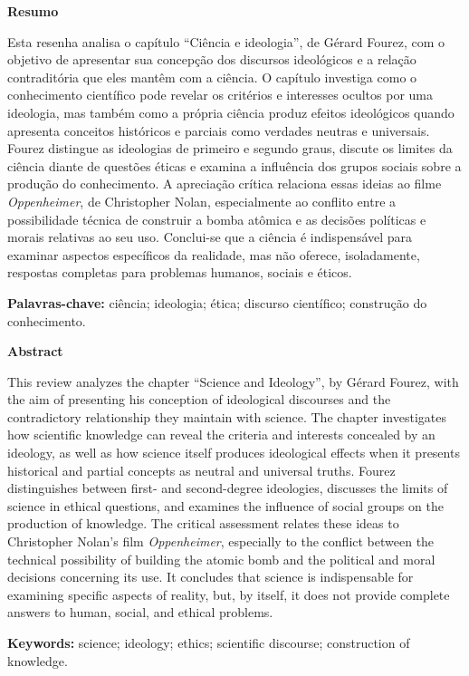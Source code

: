 \documentclass[12pt,a4paper]{article}
\begin{document}
\begin{singlespace}
\noindent\textbf{Resumo}

Esta resenha analisa o capítulo ``Ciência e ideologia'', de Gérard Fourez,
com o objetivo de apresentar sua concepção dos discursos ideológicos e a
relação contraditória que eles mantêm com a ciência. O capítulo investiga
como o conhecimento científico pode revelar os critérios e interesses
ocultos por uma ideologia, mas também como a própria ciência produz efeitos
ideológicos quando apresenta conceitos históricos e parciais como verdades
neutras e universais. Fourez distingue as ideologias de primeiro e segundo
graus, discute os limites da ciência diante de questões éticas e examina a
influência dos grupos sociais sobre a produção do conhecimento. A apreciação
crítica relaciona essas ideias ao filme \textit{Oppenheimer}, de Christopher
Nolan, especialmente ao conflito entre a possibilidade técnica de construir
a bomba atômica e as decisões políticas e morais relativas ao seu uso.
Conclui-se que a ciência é indispensável para examinar aspectos específicos
da realidade, mas não oferece, isoladamente, respostas completas para
problemas humanos, sociais e éticos.

\vspace{0.3cm}

\noindent\textbf{Palavras-chave:} ciência; ideologia; ética; discurso
científico; construção do conhecimento.

\vspace{0.5cm}

\noindent\textbf{Abstract}

This review analyzes the chapter ``Science and Ideology'', by Gérard Fourez,
with the aim of presenting his conception of ideological discourses and the
contradictory relationship they maintain with science. The chapter
investigates how scientific knowledge can reveal the criteria and interests
concealed by an ideology, as well as how science itself produces ideological
effects when it presents historical and partial concepts as neutral and
universal truths. Fourez distinguishes between first- and second-degree
ideologies, discusses the limits of science in ethical questions, and
examines the influence of social groups on the production of knowledge. The
critical assessment relates these ideas to Christopher Nolan's film
\textit{Oppenheimer}, especially to the conflict between the technical
possibility of building the atomic bomb and the political and moral decisions
concerning its use. It concludes that science is indispensable for examining
specific aspects of reality, but, by itself, it does not provide complete
answers to human, social, and ethical problems.

\vspace{0.3cm}

\noindent\textbf{Keywords:} science; ideology; ethics; scientific discourse;
construction of knowledge.
\end{singlespace}
\end{document}
